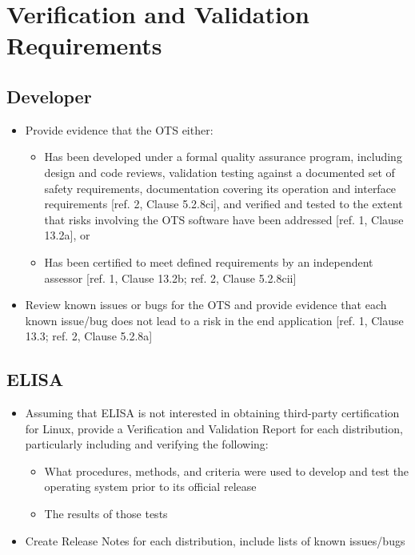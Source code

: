 \documentclass[12pt]{../Common_files/ElisaPaper}
\begin{document}
\section{Verification and Validation Requirements}
\subsection{Developer}

\begin{itemize}

\item Provide evidence that the OTS either:

\begin{itemize}

\item Has been developed under a formal quality assurance program, including design and code reviews, validation testing against a documented set of safety requirements, documentation covering its operation and interface requirements [ref. 2, Clause 5.2.8ci], and verified and tested to the extent that risks involving the OTS software have been addressed [ref. 1, Clause 13.2a], or

\item Has been certified to meet defined requirements by an independent assessor [ref. 1, Clause 13.2b; ref. 2, Clause 5.2.8cii]

\end{itemize}

\item Review known issues or bugs for the OTS and provide evidence that each known issue/bug does not lead to a risk in the end application [ref. 1, Clause 13.3; ref. 2, Clause 5.2.8a]

\end{itemize}

\subsection{ELISA}

\begin{itemize}

\item Assuming that ELISA is not interested in obtaining third-party certification for Linux, provide a Verification and Validation Report  for each distribution, particularly including and verifying the following:

\begin{itemize}

\item What procedures, methods, and criteria were used to develop and test the operating system prior to its official release

\item The results of those tests

\end{itemize}

\item Create Release Notes for each distribution, include lists of known issues/bugs

\end{itemize}
\end{document}
